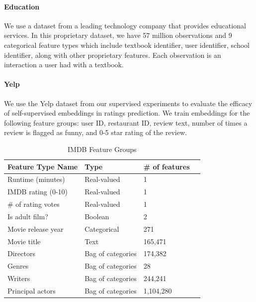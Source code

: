 \documentclass[letterpaper]{article}
\begin{document}
\paragraph{Education}
We use a dataset from a leading technology company that provides educational services.
In this proprietary dataset, we have 57  million observations and 9 categorical feature types which include textbook identifier, user identifier, school identifier,
along with other proprietary features.
Each observation is an interaction a user had with a textbook.

\paragraph{Yelp}
We use the Yelp dataset from our supervised experiments to evaluate the efficacy of self-supervised embeddings in ratings prediction.
We train embeddings for the following feature groups: user ID, restaurant ID, review text, number of times a review is flagged as funny, and 0-5 star rating of the review.
\begin{table}
\centering
\footnotesize
\caption{IMDB Feature Groups}
\label{tab:features}
\begin{tabular}{@{}lllp{6cm}@{}}
\toprule
Feature Type Name      & Type              & \# of features  \\ \midrule
Runtime (minutes)       & Real-valued       & 1          \\
IMDB rating (0-10)      & Real-valued       & 1          \\
\# of rating votes & Real-valued       & 1           \\
Is adult film?          & Boolean           & 2         \\
Movie release year      & Categorical          & 271      \\
Movie title             & Text      & 165,471       \\
Directors               & Bag of categories & 174,382                          \\
Genres                  & Bag of categories & 28                  \\
Writers                 & Bag of categories & 244,241             \\
Principal actors & Bag of categories & 1,104,280      \\\bottomrule
\end{tabular}
\end{table}
\end{document}
